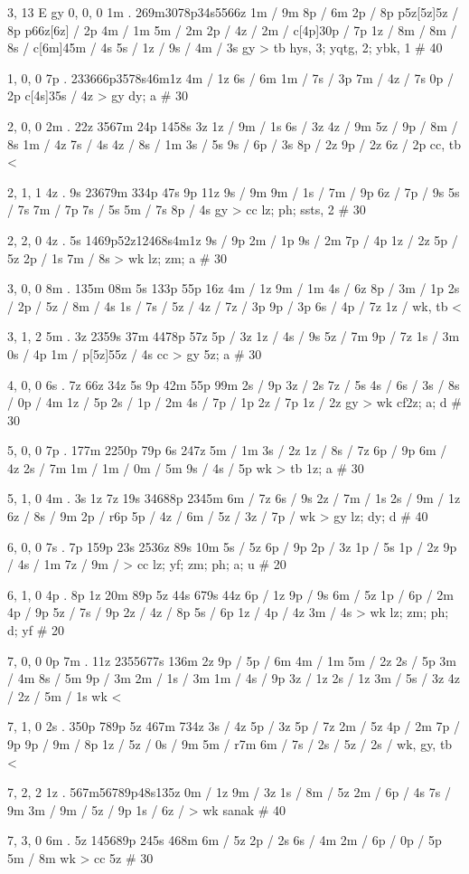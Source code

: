 3, 13
E
gy 
0, 0, 0
1m . 
269m3078p34s5566z 
1m / 9m 
8p / 6m 
2p / 8p 
p5z[5z]5z / 8p 
p66z[6z] / 2p 
4m / 1m 
5m / 2m 
2p / 
4z / 
2m / 
c[4p]30p / 7p 
1z / 
8m / 
8m / 
8s / 
c[6m]45m / 4s 
5s / 
1z / 
9s / 
4m / 3s 
gy > tb 
hys, 3; yqtg, 2; ybk, 1 # 40 

1, 0, 0
7p . 
233666p3578s46m1z 
4m / 1z 
6s / 6m 
1m / 
7s / 3p 
7m / 
4z / 7s 
0p / 2p 
c[4s]35s / 4z 
> gy 
dy; a # 30

2, 0, 0
2m . 
22z 3567m 24p 1458s 3z 
1z / 
9m / 1s 
6s / 3z 
4z / 9m 
5z / 
9p / 
8m / 8s 
1m / 4z 
7s / 4s 
4z / 
8s / 1m 
3s / 5s 
9s / 
6p / 3s 
8p / 2z 
9p / 2z 
6z / 2p 
cc, tb <

2, 1, 1 
4z . 9s
23679m 334p 47s 9p 11z 
9s / 9m 
9m / 
1s / 
7m / 9p 
6z / 
7p / 9s 
5s / 7s 
7m / 7p 
7s / 5s 
5m / 7s 
8p / 4s 
gy > cc 
lz; ph; ssts, 2 # 30 

2, 2, 0 
4z . 5s
1469p52z12468s4m1z 
9s / 9p 
2m / 1p 
9s / 2m 
7p / 4p 
1z / 2z 
5p / 5z 
2p / 1s 
7m / 8s 
> wk 
lz; zm; a # 30 

3, 0, 0 
8m . 
135m 08m 5s 133p 55p 16z 
4m / 1z 
9m / 1m 
4s / 6z 
8p / 
3m / 1p 
2s / 
2p / 
5z / 
8m / 4s 
1s / 
7s / 
5z /
4z / 
7z / 3p 
9p / 3p 
6s / 
4p / 7z 
1z / 
wk, tb <

3, 1, 2 
5m . %
3z 2359s 37m 4478p 57z 
5p / 3z 
1z / 
4s / 9s 
5z / 7m 
9p / 7z 
1s / 3m 
0s / 4p 
1m / 
p[5z]55z / 4s 
cc > gy 
5z; a # 30 

4, 0, 0 
6s . 
7z 66z 34z 5s 9p 42m 55p 99m 
2s / 9p 
3z / 2s 
7z / 5s 
4s / 
6s / 
3s / 
8s / 
0p / 4m 
1z / 5p 
2s / 
1p / 2m 
4s / 
7p / 1p 
2z / 7p 
1z / 2z 
gy > wk 
cf2z; a; d # 30 

5, 0, 0
7p . 
177m 2250p 79p 6s 247z 
5m / 1m 
3s / 2z 
1z / 
8s / 7z 
6p / 9p 
6m / 4z 
2s / 7m 
1m / 
1m / 
0m / 5m 
9s / 
4s / 5p 
wk > tb 
1z; a # 30

5, 1, 0 
4m . 3s
1z 7z 19s 34688p 2345m 
6m / 7z 
6s / 9s 
2z / 
7m / 1s 
2s / 
9m / 1z 
6z / 
8s / 9m 
2p / r6p 
5p / 
4z / 
6m / 
5z / 
3z /
7p / 
wk > gy 
lz; dy; d # 40 

6, 0, 0 
7s . 7p
159p 23s 2536z 89s 10m 
5s / 5z 
6p / 9p 
2p / 3z 
1p / 5s 
1p / 2z 
9p / 
4s / 1m 
7z / 
9m / 
> cc 
lz; yf; zm; ph; a; u # 20 

6, 1, 0 
4p . 8p
1z 20m 89p 5z 44s 679s 44z 
6p / 1z 
9p / 9s 
6m / 5z 
1p / 
6p / 2m 
4p / 9p 
5z / 
7s / 9p 
2z / 
4z / 8p 
5s / 6p 
1z / 
4p / 4z 
3m / 4s 
> wk 
lz; zm; ph; d; yf # 20 

7, 0, 0
0p 7m . 
11z 2355677s 136m 2z 
9p / 
5p / 6m 
4m / 1m 
5m / 2z 
2s / 5p 
3m / 4m 
8s / 5m 
9p / 3m 
2m / 
1s / 3m 
1m / 
4s / 9p 
3z / 1z 
2s / 1z 
3m / 
5s / 3z 
4z / 
2z / 
5m / 1s 
wk < 

7, 1, 0
2s .
350p 789p 5z 467m 734z 
3s / 4z 
5p / 3z 
5p / 7z 
2m / 5z 
4p / 2m 
7p / 9p 
9p / 
9m / 8p 
1z / 
5z / 
0s / 9m 
5m / r7m 
6m / 
7s / 
2s / 
5z / 
2s /
wk, gy, tb <

7, 2, 2
1z . 
567m56789p48s135z 
0m / 1z 
9m / 3z 
1s / 
8m / 5z 
2m / 
6p / 4s 
7s / 9m 
3m / 
9m / 
5z / 9p 
1s / 
6z / 
> wk 
sanak # 40 

7, 3, 0
6m . 
5z 145689p 245s 468m 
6m / 5z 
2p / 2s 
6s / 4m 
2m / 
6p / 
0p / 5p 
5m / 8m 
wk > cc 
5z # 30
